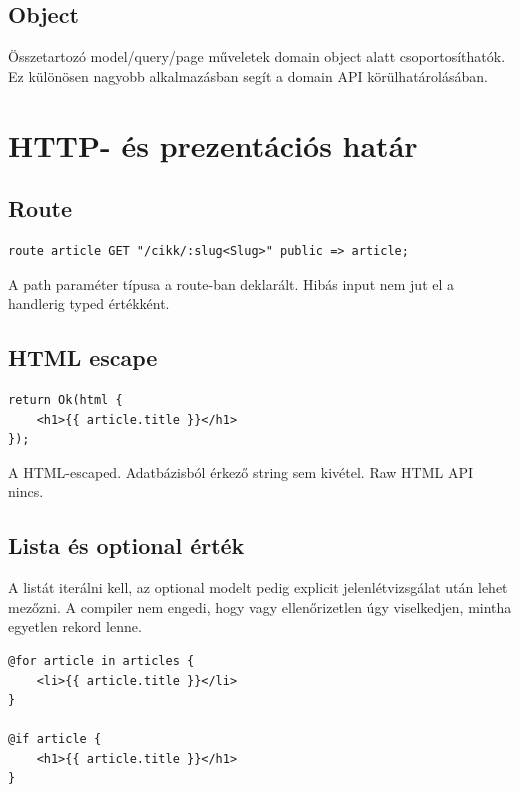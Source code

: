 \subsection*{Object}

Összetartozó model/query/page műveletek domain object alatt csoportosíthatók. Ez különösen nagyobb alkalmazásban segít a domain API körülhatárolásában.


\section{HTTP- és prezentációs határ}

\subsection*{Route}

\begin{lstlisting}[language=RWLang]
route article GET "/cikk/:slug<Slug>" public => article;
\end{lstlisting}

A path paraméter típusa a route-ban deklarált. Hibás input nem jut el a handlerig typed értékként.

\subsection*{HTML escape}

\begin{lstlisting}[language=RWLang]
return Ok(html {
    <h1>{{ article.title }}</h1>
});
\end{lstlisting}

A  HTML-escaped. Adatbázisból érkező string sem kivétel. Raw HTML API nincs.

\subsection*{Lista és optional érték}

A listát iterálni kell, az optional modelt pedig explicit jelenlétvizsgálat után lehet mezőzni. A compiler nem engedi, hogy  vagy ellenőrizetlen  úgy viselkedjen, mintha egyetlen rekord lenne.

\begin{lstlisting}[language=RWLang]
@for article in articles {
    <li>{{ article.title }}</li>
}

@if article {
    <h1>{{ article.title }}</h1>
}
\end{lstlisting}

